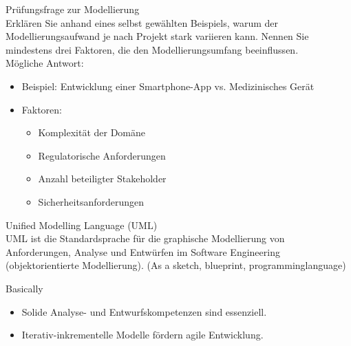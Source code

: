 \begin{example2}{Prüfungsfrage zur Modellierung}\\
Erklären Sie anhand eines selbst gewählten Beispiels, warum der Modellierungsaufwand je nach Projekt stark variieren kann. Nennen Sie mindestens drei Faktoren, die den Modellierungsumfang beeinflussen.
\vspace{3mm}\\
Mögliche Antwort:
\begin{itemize}
    \item Beispiel: Entwicklung einer Smartphone-App vs. Medizinisches Gerät
    \item Faktoren:
    \begin{itemize}
        \item Komplexität der Domäne
        \item Regulatorische Anforderungen
        \item Anzahl beteiligter Stakeholder
        \item Sicherheitsanforderungen
    \end{itemize}
\end{itemize}
\end{example2}

\begin{definition}{Unified Modelling Language (UML)}\\
UML ist die Standardsprache für die graphische Modellierung von Anforderungen, Analyse und Entwürfen im Software Engineering (objektorientierte Modellierung). (As a sketch, blueprint, programminglanguage)
\end{definition}

\begin{concept}{Basically}
\begin{itemize}
    \item Solide Analyse- und Entwurfskompetenzen sind essenziell.
    \item Iterativ-inkrementelle Modelle fördern agile Entwicklung.
\end{itemize}
\end{concept}

